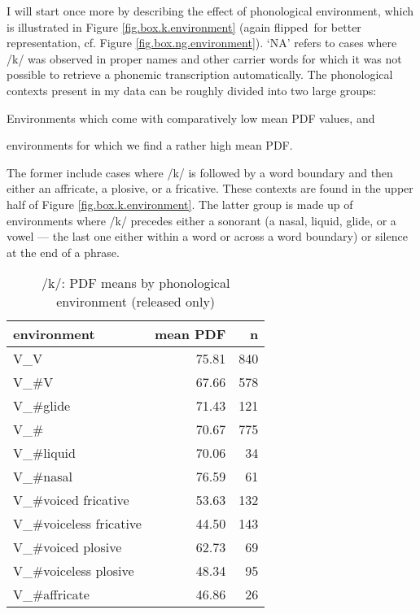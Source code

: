 I will start once more by describing the effect of phonological environment, which is illustrated in Figure \ref{fig.box.k.environment} (again flipped\ for better representation, cf. Figure \ref{fig.box.ng.environment}).
`NA' refers to cases where /k/ was observed in proper names and other carrier words for which it was not possible to retrieve a phonemic transcription automatically.
The phonological contexts present in my data can be roughly divided into two large groups:
\begin{inparaenum}[(1)]
	\item Environments which come with comparatively low mean PDF values, and
	\item environments for which we find a rather high mean PDF.
\end{inparaenum}
The former include cases where /k/ is followed by a word boundary and then either an affricate, a plosive, or a fricative.
These contexts are found in the upper half of Figure \ref{fig.box.k.environment}.
The latter group is made up of environments where /k/ precedes either a sonorant (a nasal, liquid, glide, or a vowel --- the last one either within a word or across a word boundary) or silence at the end of a phrase.

\begin{table}[h]
	\centering
	\caption{/k/: PDF means by phonological environment (released only)}
	\label{tab.k.mean.environment}
	\begin{tabular}{lrr}
		\hline
		environment & mean PDF & n\\
		\hline
		V\_V & 75.81 & 840\\
		V\_\#V & 67.66 & 578\\
		V\_\#glide & 71.43 & 121\\
		V\_\# & 70.67 & 775\\
		V\_\#liquid & 70.06 & 34\\
		V\_\#nasal & 76.59 & 61\\
		V\_\#voiced fricative & 53.63 & 132\\
		V\_\#voiceless fricative & 44.50 & 143\\
		V\_\#voiced plosive & 62.73 & 69\\
		V\_\#voiceless plosive & 48.34 & 95\\
		V\_\#affricate & 46.86 & 26\\
		\hline
	\end{tabular}
\end{table}


